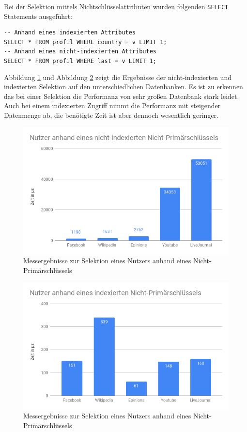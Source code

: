 Bei der Selektion mittels Nichtschlüsselattributen wurden folgenden \lstinline{SELECT} Statements ausgeführt:
\begin{lstlisting}
-- Anhand eines indexierten Attributes
SELECT * FROM profil WHERE country = v LIMIT 1;
-- Anhand eines nicht-indexierten Attributes
SELECT * FROM profil WHERE last = v LIMIT 1;
\end{lstlisting}

Abbildung \ref{fig:NutzerNPk} und Abbildung \ref{fig:NutzerNPkI} zeigt die Ergebnisse der nicht-indexierten und indexierten Selektion auf den unterschiedlichen Datenbanken. Es ist zu erkennen das bei einer Selektion die Performanz von sehr großen Datenbank stark leidet. Auch bei einem indexierten Zugriff nimmt die Performanz mit steigender Datenmenge ab, die benötigte Zeit ist aber dennoch wesentlich geringer.
\begin{figure}[h]
	\centering
	\includegraphics[width=\textwidth]{images/NutzerNPk.png}
	\caption{Messergebnisse zur Selektion eines Nutzers anhand eines Nicht-Primärschlüssels}
	\label{fig:NutzerNPk}
\end{figure}

\begin{figure}[h]
	\centering
	\includegraphics[width=\textwidth]{images/NutzerNPkI.png}
	\caption{Messergebnisse zur Selektion eines Nutzers anhand eines Nicht-Primärschlüssels}
	\label{fig:NutzerNPkI}
\end{figure}


